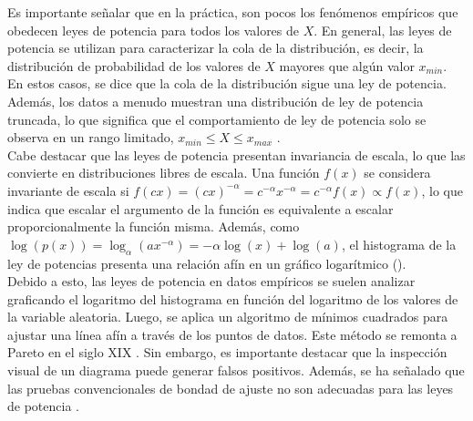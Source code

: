 Es importante señalar que en la práctica, son pocos los fenómenos empíricos que obedecen leyes de potencia para todos los valores de $X$. En general, las leyes de potencia se utilizan para caracterizar la cola de la distribución, es decir, la distribución de probabilidad de los valores de $X$ mayores que algún valor $x_{min}$. En estos casos, se dice que la cola de la distribución sigue una ley de potencia. Además, los datos a menudo muestran una distribución de ley de potencia truncada, lo que significa que el comportamiento de ley de potencia solo se observa en un rango limitado, $x_{min}\leq X \leq x_{max}$  \cite{touboul_can_2010}.\\

Cabe destacar que las leyes de potencia presentan invariancia de escala, lo que las convierte en distribuciones libres de escala. Una función $f(x)$ se considera invariante de escala si $ f(cx)  = \left(cx\right)^{-\alpha}=c^{-\alpha}x^{-\alpha}=c^{-\alpha}f(x)\propto f(x)$, lo que indica que escalar el argumento de la función es equivalente a escalar proporcionalmente la función misma. Además, como $\log(p(x))=\log_{\alpha}\left(ax^{-\alpha}\right) = -\alpha\log(x)+\log(a)$, el histograma de la ley de potencias presenta una relación afín en un gráfico logarítmico ().\\

Debido a esto, las leyes de potencia en datos empíricos se suelen analizar graficando el logaritmo del histograma en función del logaritmo de los valores de la variable aleatoria. Luego, se aplica un algoritmo de mínimos cuadrados para ajustar una línea afín a través de los puntos de datos. Este método se remonta a Pareto en el siglo XIX \cite{arnold_pareto_2008}. Sin embargo, es importante destacar que la inspección visual de un diagrama puede generar falsos positivos. Además, se ha señalado que las pruebas convencionales de bondad de ajuste no son adecuadas para las leyes de potencia \cite{newman_power_2005}.\\




